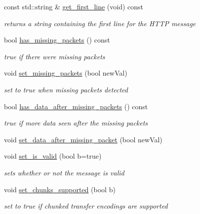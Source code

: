 \begin{DoxyCompactItemize}
\item 
const std\-::string \& \hyperlink{classpion_1_1http_1_1message_ad9c43932bae03916ad193c257a7ec6c8}{get\-\_\-first\-\_\-line} (void) const 
\begin{DoxyCompactList}\small\item\em returns a string containing the first line for the H\-T\-T\-P message \end{DoxyCompactList}\item 
bool \hyperlink{classpion_1_1http_1_1message_a0ab661db865a6d018e8487a1b4f6932b}{has\-\_\-missing\-\_\-packets} () const 
\begin{DoxyCompactList}\small\item\em true if there were missing packets \end{DoxyCompactList}\item 
void \hyperlink{classpion_1_1http_1_1message_ac0749dac4643586e3925d73782840b26}{set\-\_\-missing\-\_\-packets} (bool new\-Val)
\begin{DoxyCompactList}\small\item\em set to true when missing packets detected \end{DoxyCompactList}\item 
bool \hyperlink{classpion_1_1http_1_1message_a52fd51aca9d5a37f41a0ad18d577ddec}{has\-\_\-data\-\_\-after\-\_\-missing\-\_\-packets} () const 
\begin{DoxyCompactList}\small\item\em true if more data seen after the missing packets \end{DoxyCompactList}\item 
void \hyperlink{classpion_1_1http_1_1message_af9081484fde89d5e8bdfcb689bebdeb1}{set\-\_\-data\-\_\-after\-\_\-missing\-\_\-packet} (bool new\-Val)
\item 
void \hyperlink{classpion_1_1http_1_1message_a24b208fd31a21a5bdb76a6ba8683321e}{set\-\_\-is\-\_\-valid} (bool b=true)
\begin{DoxyCompactList}\small\item\em sets whether or not the message is valid \end{DoxyCompactList}\item 
void \hyperlink{classpion_1_1http_1_1message_a524e682e0c1843d2bee6ad83c6b9e218}{set\-\_\-chunks\-\_\-supported} (bool b)
\begin{DoxyCompactList}\small\item\em set to true if chunked transfer encodings are supported \end{DoxyCompactList}\item 

\end{DoxyCompactItemize}

